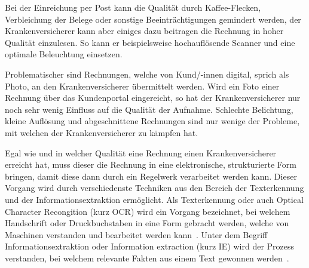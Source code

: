 \documentclass{hwz}
\begin{document}
Bei der Einreichung per Post kann die Qualität durch Kaffee-Flecken, Verbleichung der Belege oder sonstige Beeinträchtigungen gemindert werden, der Krankenversicherer kann aber einiges dazu beitragen die Rechnung in hoher Qualität einzulesen. So kann er beispielsweise hochauflösende Scanner und eine optimale Beleuchtung einsetzen.

Problematischer sind Rechnungen, welche von Kund/-innen digital, sprich als Photo, an den Krankenversicherer übermittelt werden. Wird ein Foto einer Rechnung über das Kundenportal eingereicht, so hat der Krankenversicherer nur noch sehr wenig Einfluss auf die Qualität der Aufnahme. Schlechte Belichtung, kleine Auflösung und abgeschnittene Rechnungen sind nur wenige der Probleme, mit welchen der Krankenversicherer zu kämpfen hat.

Egal wie und in welcher Qualität eine Rechnung einen Krankenversicherer erreicht hat, muss dieser die Rechnung in eine elektronische, strukturierte Form bringen, damit diese dann durch ein Regelwerk verarbeitet werden kann. Dieser Vorgang wird durch verschiedenste Techniken aus den Bereich der Texterkennung und der Informationsextraktion ermöglicht. Als Texterkennung oder auch Optical Character Recongition (kurz OCR) wird ein Vorgang bezeichnet, bei welchem Handschrift oder Druckbuchstaben in eine Form gebracht werden, welche von Maschinen verstanden und bearbeitet werden kann~\autocite{Xue2014OpticalRecognition}. Unter dem Begriff Informationsextraktion oder Information extraction (kurz IE) wird der Prozess verstanden, bei welchem relevante Fakten aus einem Text gewonnen werden~\autocite{Piskorski2012InformationFuture}.


\end{document}

